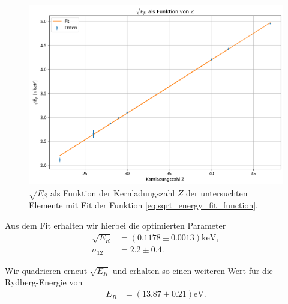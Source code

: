 \begin{figure}[H]
  \centering
  \includegraphics[width=\textwidth]{files/K_beta_vs_Z_with_fit.png}
  \caption{$\sqrt{E_{\beta}}$ als Funktion der Kernladungszahl $Z$ der untersuchten Elemente mit Fit der Funktion \eqref{eq:sqrt_energy_fit_function}.}
  \label{fig:K_beta_vs_Z_with_fit}
\end{figure}

Aus dem Fit erhalten wir hierbei die optimierten Parameter
\begin{align}
  \sqrt{E_R} &= (0.1178 \pm 0.0013) \si{\kilo\electronvolt},\\[1em]
  \sigma_{12} &= 2.2 \pm 0.4.
\end{align}

Wir quadrieren erneut $\sqrt{E_R}$ und erhalten so einen weiteren Wert für die Rydberg-Energie von
\begin{align}
  E_R &= (13.87 \pm 0.21) \si{\electronvolt}.
\end{align}

